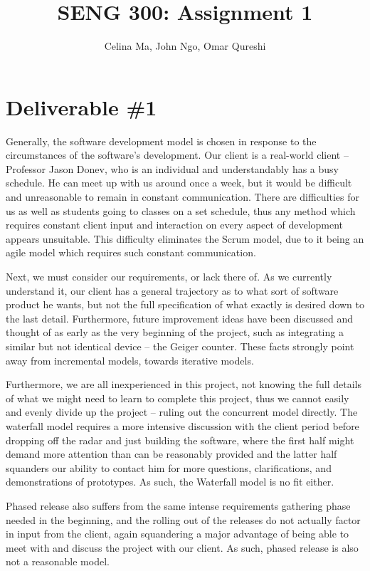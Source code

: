\documentclass[11pt,a4paper]{article}
\title{\vspace{-2.0cm} \textbf{SENG 300: Assignment 1}}
\author{Celina Ma, John Ngo, Omar Qureshi}
\begin{document}
\maketitle
\def\textfraction{.01}
\def\topfraction{.99}
\section*{Deliverable \#1}

Generally, the software development model is chosen in response to the circumstances of the software’s development. Our client is a real-world client – Professor Jason Donev, who is an individual and understandably has a busy schedule. He can meet up with us around once a week, but it would be difficult and unreasonable to remain in constant communication. There are difficulties for us as well as students going to classes on a set schedule, thus any method which requires constant client input and interaction on every aspect of development appears unsuitable. This difficulty eliminates the Scrum model, due to it being an agile model which requires such constant communication.

Next, we must consider our requirements, or lack there of. As we currently understand it, our client has a general trajectory as to what sort of software product he wants, but not the full specification of what exactly is desired down to the last detail. Furthermore, future improvement ideas have been discussed and thought of as early as the very beginning of the project, such as integrating a similar but not identical device – the Geiger counter. These facts strongly point away from incremental models, towards iterative models. 

Furthermore, we are all inexperienced in this project, not knowing the full details of what we might need to learn to complete this project, thus we cannot easily and evenly divide up the project – ruling out the concurrent model directly. The waterfall model requires a more intensive discussion with the client period before dropping off the radar and just building the software, where the first half might demand more attention than can be reasonably provided and the latter half squanders our ability to contact him for more questions, clarifications, and demonstrations of prototypes. As such, the Waterfall model is no fit either.

Phased release also suffers from the same intense requirements gathering phase needed in the beginning, and the rolling out of the releases do not actually factor in input from the client, again squandering a major advantage of being able to meet with and discuss the project with our client. As such, phased release is also not a reasonable model.
\end{document}
